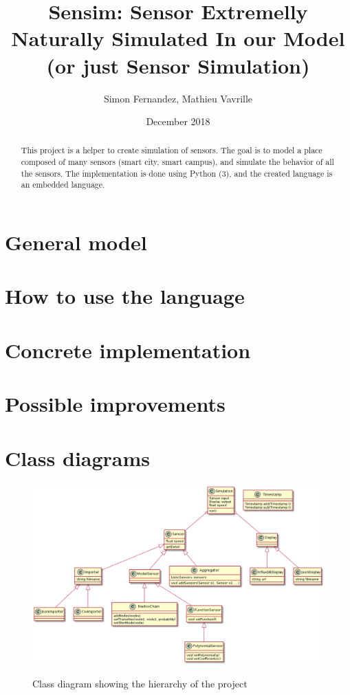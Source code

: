 \documentclass[a4paper,11pt]{article}
\title{Sensim: Sensor Extremelly Naturally Simulated In our Model (or just Sensor Simulation)}
\author{Simon Fernandez, Mathieu Vavrille}
\date{December 2018}
\begin{document}
\maketitle

\begin{abstract}
  This project is a helper to create simulation of sensors. The goal is to model a place composed of many sensors (smart city, smart campus), and simulate the behavior of all the sensors. The implementation is done using Python (3), and the created language is an embedded language.
\end{abstract}


\section{General model}





\section{How to use the language}







\section{Concrete implementation}






\section{Possible improvements}




\appendix

\section{Class diagrams}



\begin{figure}
  \centering
  \includegraphics[scale = 0.45]{figures/meta-model.png}
  \label{meta-model_fig}
  \caption{Class diagram showing the hierarchy of the project}
\end{figure}
\end{document}
